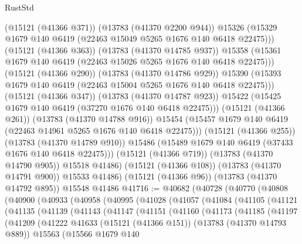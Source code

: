 \begin{lexlean}{RustStd}
\begin{coremodule}
                    (@15121 (@41366 @371))
                    (@13783 (@41370 @2200 @944))
                    @15326
                    (@15329 @1679 @140 @6419 (@22463 @15049 @5265 @1676 @140 @6418 @22475)))
                  (@15121 (@41366 @363))
                  (@13783 (@41370 @14785 @937))
                  @15358
                  (@15361 @1679 @140 @6419 (@22463 @15026 @5265 @1676 @140 @6418 @22475)))
                (@15121 (@41366 @290))
                (@13783 (@41370 @14786 @929))
                @15390
                (@15393 @1679 @140 @6419 (@22463 @15004 @5265 @1676 @140 @6418 @22475)))
              (@15121 (@41366 @347))
              (@13783 (@41370 @14787 @923))
              @15422
              (@15425 @1679 @140 @6419 (@37270 @1676 @140 @6418 @22475)))
            (@15121 (@41366 @261))
            (@13783 (@41370 @14788 @916))
            @15454
            (@15457 @1679 @140 @6419 (@22463 @14961 @5265 @1676 @140 @6418 @22475)))
          (@15121 (@41366 @255))
          (@13783 (@41370 @14789 @910))
          @15486
          (@15489 @1679 @140 @6419 (@37433 @1676 @140 @6418 @22475)))
        (@15121 (@41366 @719))
        (@13783 (@41370 @14790 @905))
        @15518
        @41486)
      (@15121 (@41366 @108))
      (@13783 (@41370 @14791 @900))
      @15533
      @41486)
    (@15121 (@41366 @96))
    (@13783 (@41370 @14792 @895))
    @15548
    @41486
@41716 := @40682
    (@40728
      (@40770
        (@40808
          (@40900
            (@40933
              (@40958
                (@40995
                  (@41028
                    (@41057
                      (@41084
                        (@41105
                          (@41121
                            (@41135
                              (@41139
                                (@41143
                                  (@41147
                                    (@41151
                                      (@41160
                                        (@41173
                                          (@41185
                                            (@41197
                                              (@41209
                                                (@41222
                                                  @41633
                                                  (@15121 (@41366 @151))
                                                  (@13783 (@41370 @14793 @889))
                                                  @15563
                                                  (@15566
                                                    @1679
                                                    @140

\end{coremodule}
\end{lexlean}
